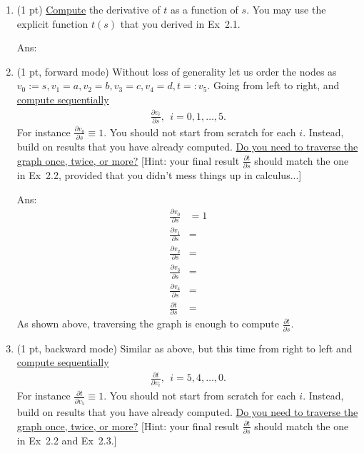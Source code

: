 \documentclass[10pt,letter,notitlepage]{article}
\newcommand{\ans}[1]{{\color{blue}\textsf{Ans}: #1}}
\newcommand{\red}[1]{{\color{red}#1}}
\newcommand{\blue}[1]{{\color{blue}#1}}
\begin{document}
\begin{exercise}
\begin{enumerate}
			The function implemented by each node is depicted on the \red{incoming} edge. For example, we have $a = \cos s$. For node $d$, we also \blue{multiply} the two incoming edges. 
			
			\ans{\vskip2cm}
			
			\item (1 pt) \uline{Compute} the derivative of $t$ as a function of $s$. You may use the explicit function $t(s)$ that you derived in Ex~2.1.
			
			\ans{\vskip2cm}
			
			\item (1 pt, forward mode) Without loss of generality let us order the nodes as $v_0:=s, v_1=a, v_2 = b, v_3 = c, v_4 = d, t=:v_5$. Going from left to right, and \uline{compute sequentially} 
			\begin{align}
			\frac{\partial v_{i}}{\partial s}, ~~ i = 0, 1, \ldots, 5.
			\end{align}
			For instance $\tfrac{\partial v_0}{\partial s} \equiv 1$. You should not start from scratch for each $i$. Instead, build on results that you have already computed. \uline{Do you need to \href{https://en.wikipedia.org/wiki/Graph_traversal}{traverse} the graph once, twice, or more?} [Hint: your final result $\frac{\partial t}{\partial s}$ should match the one in Ex~2.2, provided that you didn't mess things up in calculus...]
			
			\ans{\vskip1cm
			\begin{align}
			\frac{\partial v_{0}}{\partial s} & = 1 \\
			\frac{\partial v_{1}}{\partial s} & =  \\
			\frac{\partial v_{2}}{\partial s} & =  \\
			\frac{\partial v_{3}}{\partial s} & =  \\
			\frac{\partial v_{4}}{\partial s} & =  \\								
			\frac{\partial t}{\partial s} & =  
			\end{align}
			As shown above, traversing the graph \qquad\qquad is enough to compute $\frac{\partial t}{\partial s}$.
			}
								
			\item (1 pt, backward mode) Similar as above, but this time from right to left and \uline{compute sequentially}
			\begin{align}
			\frac{\partial t}{\partial v_{i}}, ~~ i = 5, 4, \ldots, 0.
			\end{align}
			For instance $\tfrac{\partial t}{\partial v_5} \equiv 1$. You should not start from scratch for each $i$. Instead, build on results that you have already computed. \uline{Do you need to \href{https://en.wikipedia.org/wiki/Graph_traversal}{traverse} the graph once, twice, or more?} [Hint: your final result $\frac{\partial t}{\partial s}$ should match the one in Ex~2.2 and Ex~2.3.]
			

\end{enumerate}
\end{exercise}
\end{document}

